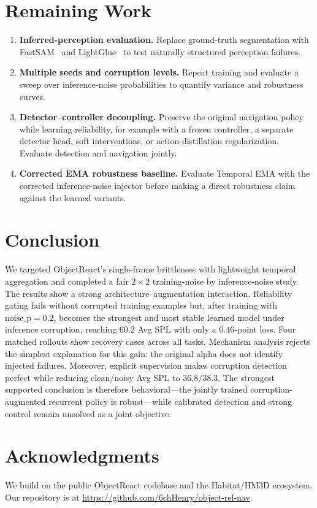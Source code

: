 \documentclass[conference]{IEEEtran}
\begin{document}
\section{Remaining Work}
\label{sec:plan}
\begin{enumerate}
\item \textbf{Inferred-perception evaluation.} Replace ground-truth segmentation with FastSAM~\cite{zhao2023fastsam} and LightGlue~\cite{lindenberger2023lightglue} to test naturally structured perception failures.
\item \textbf{Multiple seeds and corruption levels.} Repeat training and evaluate a sweep over inference-noise probabilities to quantify variance and robustness curves.
\item \textbf{Detector--controller decoupling.} Preserve the original navigation policy while learning reliability, for example with a frozen controller, a separate detector head, soft interventions, or action-distillation regularization. Evaluate detection and navigation jointly.
\item \textbf{Corrected EMA robustness baseline.} Evaluate Temporal EMA with the corrected inference-noise injector before making a direct robustness claim against the learned variants.
\end{enumerate}

\section{Conclusion}
\label{sec:conclusion}
We targeted ObjectReact's single-frame brittleness with lightweight temporal aggregation and completed a fair $2{\times}2$ training-noise by inference-noise study. The results show a strong architecture--augmentation interaction. Reliability gating fails without corrupted training examples but, after training with $\mathrm{noise\_p}{=}0.2$, becomes the strongest and most stable learned model under inference corruption, reaching $60.2$ Avg SPL with only a $0.46$-point loss. Four matched rollouts show recovery cases across all tasks. Mechanism analysis rejects the simplest explanation for this gain: the original alpha does not identify injected failures. Moreover, explicit supervision makes corruption detection perfect while reducing clean/noisy Avg SPL to $36.8/38.3$. The strongest supported conclusion is therefore behavioral---the jointly trained corruption-augmented recurrent policy is robust---while calibrated detection and strong control remain unsolved as a joint objective.

\section*{Acknowledgments}
We build on the public ObjectReact codebase and the Habitat/HM3D ecosystem. Our repository is at \url{https://github.com/6chHenry/object-rel-nav}.

{\footnotesize
\setlength{\bibsep}{2pt plus 0.4ex}


}
\end{document}
